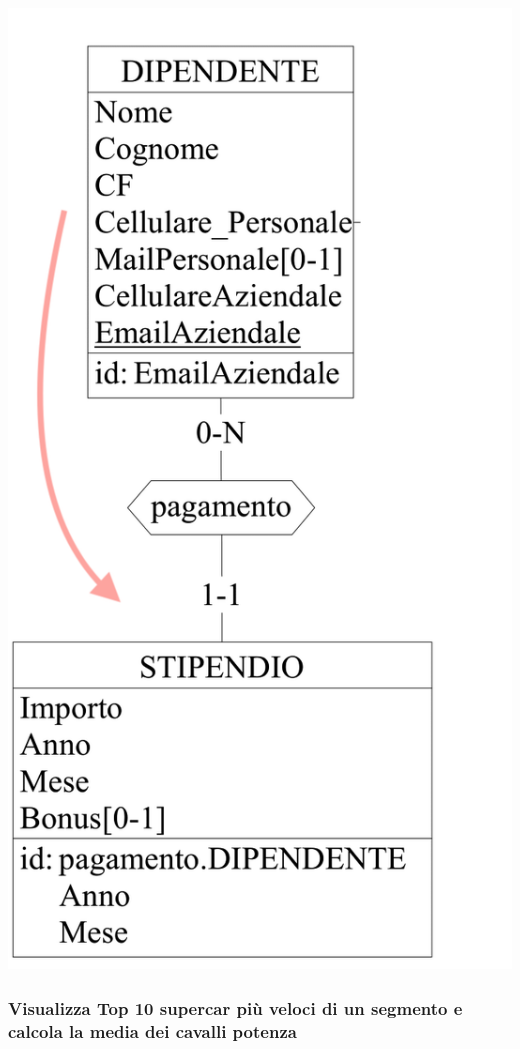 \documentclass[11pt]{article}
\begin{document}
\begin{center}
    \includegraphics[scale=0.53]{images/navigationSchemes/bonusDipendente.png}
\end{center}

\subsubsection{Visualizza Top 10 supercar più veloci di un segmento e calcola la
media dei cavalli potenza}
\end{document}
